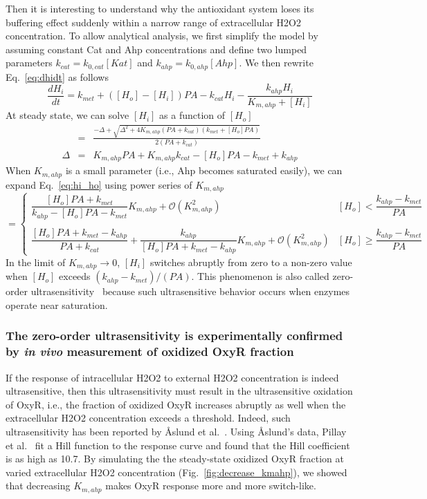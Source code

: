 \documentclass[10pt]{article}
\begin{document}
Then it is interesting to understand why the antioxidant system loses its buffering effect suddenly within a narrow range of extracellular H2O2 concentration. To allow analytical analysis, we first simplify the model by assuming constant Cat and Ahp concentrations and define two lumped parameters $k_{cat}=k_{0,cat}[Kat]$ and $k_{ahp}=k_{0,ahp}[Ahp]$. We then rewrite Eq.~\ref{eq:dhidt} as follows
\begin{equation}
\frac{dH_i}{dt} = k_{met}+([H_o]-[H_i])PA -k_{cat}H_i- \dfrac{k_{ahp}H_i}{K_{m,ahp}+[H_i]}
\end{equation}
 At steady state, we can solve $[H_i]$ as a function of $[H_o]$
\begin{eqnarray}
[H_i] &=& \frac{-\Delta +\sqrt{\Delta^2+4K_{m,ahp}(PA+k_{cat})(k_{met}+[H_o]PA)}}{2(PA+k_{cat})}  \label{eq:hi_ho}\\
\Delta &=& K_{m,ahp}PA+K_{m,ahp}k_{cat}-[H_o]PA-k_{met}+k_{ahp}
\end{eqnarray}
When $K_{m,ahp}$ is a small parameter (i.e., Ahp becomes saturated easily), we can expand Eq.~\ref{eq:hi_ho} using power series of $K_{m,ahp}$
\begin{equation*}
[H_i] = \begin{cases}
\dfrac{[H_o]PA+k_{met}}{k_{ahp}-[H_o]PA-k_{met}}K_{m,ahp} + \mathcal{O}(K_{m,ahp}^2) & \text{$[H_o]<\dfrac{k_{ahp}-k_{met}}{PA}$}\\
\\
\dfrac{[H_o]PA+k_{met}-k_{ahp}}{PA+k_{cat}} + \dfrac{k_{ahp}}{[H_o]PA+k_{met}-k_{ahp}}K_{m,ahp} + \mathcal{O}(K_{m,ahp}^2) &  \text{$[H_o]\ge\dfrac{k_{ahp}-k_{met}}{PA}$}
\end{cases}
\end{equation*}
In the limit of $K_{m,ahp}\to0$, $[H_i]$ switches abruptly from zero to a non-zero value when $[H_o]$ exceeds $(k_{ahp}-k_{met})/(PA)$. This phenomenon is also called zero-order ultrasensitivity~\cite{ferrell2014ultrasensitivity} because such ultrasensitive behavior occurs when enzymes operate near saturation.

\subsubsection{The zero-order ultrasensitivity is experimentally confirmed by \textit{in vivo} measurement of oxidized OxyR fraction}
\label{eq:the_zeroorder_ultrasensivity}

If the response of intracellular H2O2 to external H2O2 concentration is indeed ultrasensitive, then this ultrasensitivity must result in the ultrasensitive oxidation of OxyR, i.e., the fraction of oxidized OxyR increases abruptly as well when the extracellular H2O2 concentration exceeds a threshold. Indeed, such ultrasensitivity has been reported by Åslund et al.~\cite{aaslund1999regulation}. Using Åslund's data, Pillay et al.~\cite{pillay2016quantitative} fit a Hill function to the response curve and found that the Hill coefficient is as high as 10.7. By simulating the the steady-state oxidized OxyR fraction at varied extracellular H2O2 concentration (Fig.~\ref{fig:decrease_kmahp}), we showed that decreasing $K_{m,ahp}$ makes OxyR response more and more switch-like.
\end{document}
